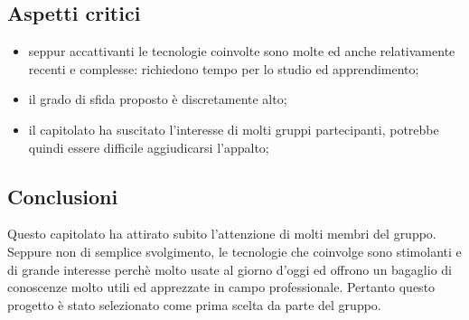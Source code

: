 \subsection{Aspetti critici}
\begin{itemize}
\item seppur accattivanti le tecnologie coinvolte sono molte ed anche relativamente recenti e complesse: richiedono tempo per lo studio ed apprendimento;
\item il grado di sfida proposto è discretamente alto;
\item il capitolato ha suscitato l'interesse di molti gruppi partecipanti, potrebbe quindi essere difficile aggiudicarsi l'appalto;
\end{itemize}

\subsection{Conclusioni}
Questo capitolato ha attirato subito l'attenzione di molti membri del gruppo. Seppure non di semplice svolgimento, le tecnologie che coinvolge sono stimolanti e di grande interesse perchè molto usate al giorno d'oggi ed offrono un bagaglio di conoscenze molto utili ed apprezzate in campo professionale. Pertanto questo progetto è stato selezionato come prima scelta da parte del gruppo.
